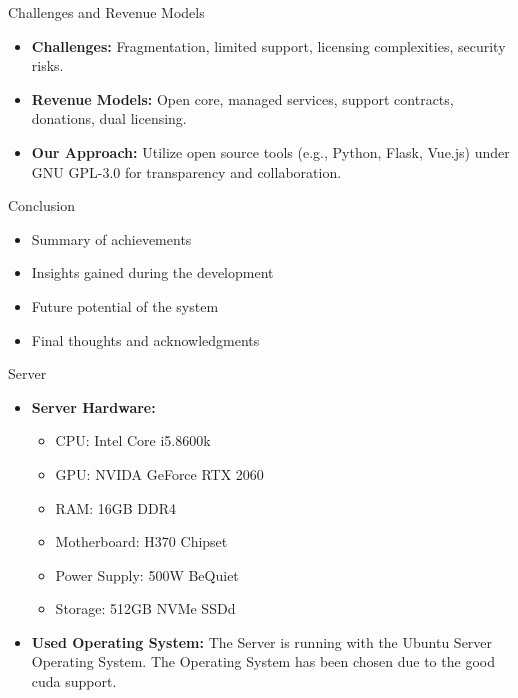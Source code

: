 \documentclass{beamer}
\begin{document}
  \begin{frame}{Challenges and Revenue Models}
    \begin{itemize}
      \item \textbf{Challenges:} Fragmentation, limited support, licensing complexities, security risks.
      \item \textbf{Revenue Models:} Open core, managed services, support contracts, donations, dual licensing.
      \item \textbf{Our Approach:} Utilize open source tools (e.g., Python, Flask, Vue.js) under GNU GPL-3.0 for transparency and collaboration.
    \end{itemize}
  \end{frame}
  


\begin{frame}{Conclusion}
  \begin{itemize}
    \item Summary of achievements
    \item Insights gained during the development
    \item Future potential of the system
    \item Final thoughts and acknowledgments
  \end{itemize}
\end{frame}


\begin{frame}{Server}
  \begin{itemize}
    \item \textbf{Server Hardware:}
      \begin{itemize}
        \item CPU: Intel Core i5.8600k
        \item GPU: NVIDA GeForce RTX 2060
        \item RAM: 16GB DDR4 
        \item Motherboard: H370 Chipset
        \item Power Supply: 500W BeQuiet
        \item Storage: 512GB NVMe SSDd
      \end{itemize}
    \item \textbf{Used Operating System:} The Server is running with the Ubuntu Server Operating System. The Operating System has been chosen due to the good cuda support. 

  \end{itemize}
\end{frame}
\end{document}
